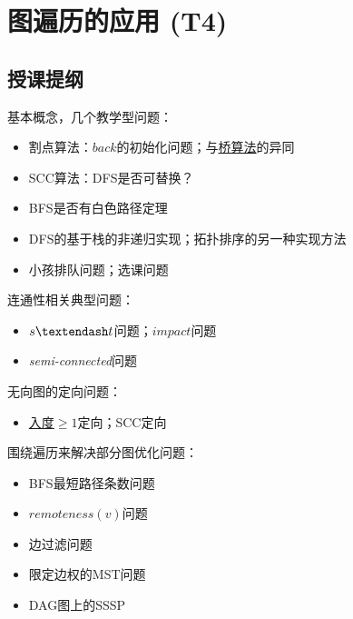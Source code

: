 \chapter{图遍历的应用 (T4)}

\section*{授课提纲}

\nid 基本概念，几个教学型问题：
\begin{itemize}
    \item 割点算法：$back$的初始化问题；与\ul{桥算法}的异同
    \item SCC算法：DFS是否可替换？
    \item BFS是否有白色路径定理
    \item DFS的基于栈的非递归实现；拓扑排序的另一种实现方法
    \item 小孩排队问题；选课问题
\end{itemize}


\nid 连通性相关典型问题：
\begin{itemize}
    \item $s\textendash t$问题；$impact$问题
    \item \textit{semi-connected}问题
\end{itemize}

\nid 无向图的定向问题：
\begin{itemize}
    \item \ul{入度$\geq 1$}定向；SCC定向
\end{itemize}


\nid 围绕遍历来解决部分图优化问题：
\begin{itemize}
    \item BFS最短路径条数问题
    \item $remoteness(v)$问题
    \item 边过滤问题
    \item 限定边权的MST问题
    \item DAG图上的SSSP
\end{itemize}


